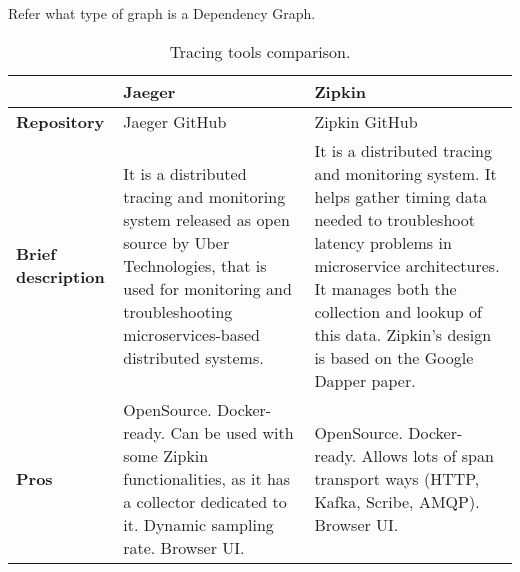 Refer what type of graph is a Dependency Graph. 

\begin{table*}
    \caption{Tracing tools comparison.}
    \label{table:tracing_tools}
    \centering
    \large
    \begin{tabularx}{\linewidth} {
            >{\hsize=0.70\hsize}X|
            >{\hsize=1.15\hsize}X|
            >{\hsize=1.15\hsize}X|}
        \cline{2-3}

         & Jaeger
         & Zipkin                                                                                                                                                                                                                                                             \\ \hline \hline
        \textbf{Repository}
         & Jaeger GitHub \cite{jaeger_github}
         & Zipkin GitHub \cite{zipkin_github}                                                                                                                                                                                                                                 \\ \hline
        \textbf{Brief description}
         & It is a distributed tracing and monitoring system released as open source by Uber Technologies, that is used for monitoring and troubleshooting microservices-based distributed systems.
         & It is a distributed tracing and monitoring system. It helps gather timing data needed to troubleshoot latency problems in microservice architectures. It manages both the collection and lookup of this data. Zipkin’s design is based on the Google Dapper paper. \\ \hline
        \textbf{Pros}
         & OpenSource. \newline
        Docker-ready. \newline
        Can be used with some Zipkin functionalities, as it has a collector dedicated to it. \newline
        Dynamic sampling rate. \newline
        Browser UI.
         & OpenSource. \newline
        Docker-ready. \newline
        Allows lots of span transport ways (HTTP, Kafka, Scribe, AMQP). \newline
        Browser UI.                                                                                                                                                                                                                                                           \\ \hline

\end{tabularx}
\end{table*}
